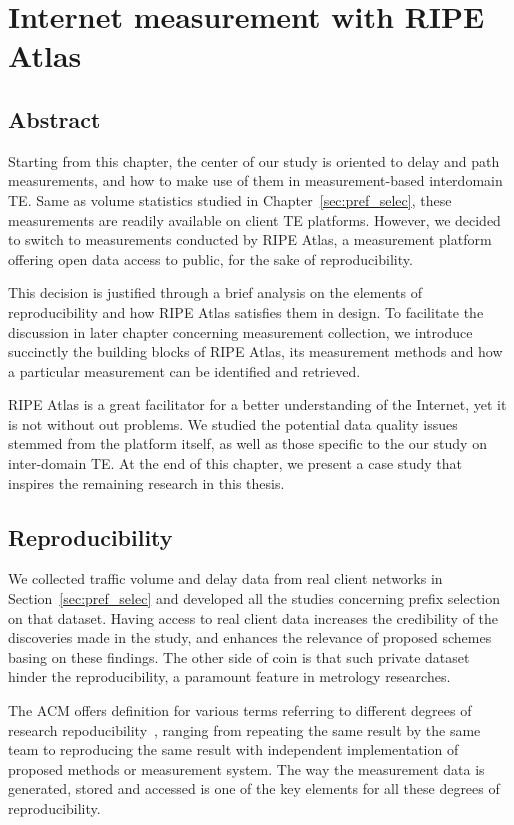 \chapter{Internet measurement with RIPE Atlas}
\label{sec:ripe_atlas}
\section*{Abstract}
Starting from this chapter, the center of our study is oriented to delay and path measurements, and how to make use of them in measurement-based interdomain \ac{TE}.
Same as volume statistics studied in Chapter~\ref{sec:pref_selec}, these measurements are readily available on client TE platforms.
However, we decided to switch to measurements conducted by RIPE Atlas, a measurement platform offering open data access to public, for the sake of reproducibility.

This decision is justified through a brief analysis on the elements of reproducibility and how RIPE Atlas satisfies them in design.
To facilitate the discussion in later chapter concerning measurement collection, we introduce succinctly the building blocks of RIPE Atlas, its measurement methods and how a particular measurement can be identified and retrieved.

RIPE Atlas is a great facilitator for a better understanding of the Internet, yet it is not without out problems. We studied the potential data quality issues stemmed from the platform itself, as well as those specific to the our study on inter-domain TE.
At the end of this chapter, we present a case study that inspires the remaining research in this thesis.
\clearpage

\section{Reproducibility}
We collected traffic volume and delay data from real client networks in Section~\ref{sec:pref_selec} and developed all the studies concerning prefix selection on that dataset.
Having access to real client data increases the credibility of the discoveries made in the study, and enhances the relevance of proposed schemes basing on these findings.
The other side of coin is that such private dataset hinder the reproducibility, a paramount feature in metrology researches.

The \acf{ACM} offers definition for various terms referring to different degrees of research repoducibility~\cite{acm}, ranging from repeating the same result by the same team to reproducing the same result with independent implementation of proposed methods or measurement system.
The way the measurement data is generated, stored and accessed is one of the key elements for all these degrees of reproducibility.

